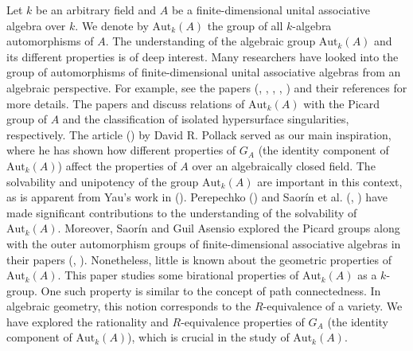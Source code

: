 \documentclass[12pt]{amsart}
\theoremstyle{definition}
\numberwithin{equation}{section}
\begin{document}
Let $k$ be an arbitrary field and $A$ be a finite-dimensional unital associative algebra over $k$. We denote by $\text{Aut}_k(A)$ the group of all $k$-algebra automorphisms of $A$.
The understanding of the algebraic group $\text{Aut}_k(A)$ and its different properties is of deep interest. Many researchers have looked into the group of automorphisms of finite-dimensional unital associative algebras from an algebraic perspective. For example, see the papers (\cite{Djokovic}, \cite{Luks}, \cite{H.G}, \cite{Stanley}, \cite{MM}) and their references for more details. The papers \cite{Frolich} and \cite{Yau2} discuss relations of $\text{Aut}_k(A)$ with the Picard group of $A$ and the classification of isolated hypersurface singularities, respectively. The article (\cite{Pollack}) by David R. Pollack served as our main inspiration, where he has shown how different properties of $G_A$ (the identity component of $\text{Aut}_k(A)$) affect the properties of $A$ over an algebraically closed field. The solvability and unipotency of the group $\text{Aut}_k(A)$ are important in this context, as is apparent from Yau's work in (\cite{Yau2}). Perepechko (\cite{Perepechko}) and Saor\'in et al. (\cite{AS1}, \cite{AS2}) have made significant contributions to the understanding of the solvability of $\text{Aut}_k(A)$. Moreover, Saor\'in and Guil Asensio explored the Picard groups along with the outer automorphism groups of finite-dimensional associative algebras in their papers (\cite{AS3}, \cite{AS2}). Nonetheless, little is known about the geometric properties of $\text{Aut}_k(A)$. This paper studies some birational properties of $\text{Aut}_k(A)$ as a $k$-group. One such property is similar to the concept of path connectedness. In algebraic geometry, this notion corresponds to the $R$-equivalence of a variety. We have explored the rationality and $R$-equivalence properties of $G_A$ (the identity component of $\mathrm{Aut}_k(A)$), which is crucial in the study of $\text{Aut}_k(A)$.
\end{document}
